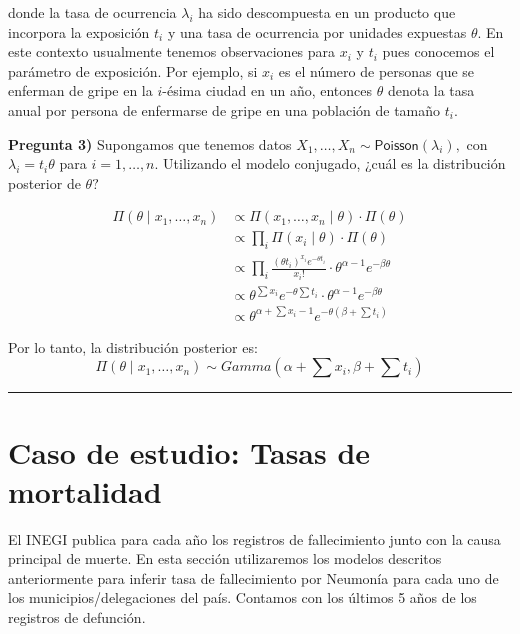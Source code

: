\documentclass[
]{article}
\begin{document}
donde la tasa de ocurrencia \(\lambda_i\) ha sido descompuesta en un
producto que incorpora la exposición \(t_i\) y una tasa de ocurrencia
por unidades expuestas \(\theta.\) En este contexto usualmente tenemos
observaciones para \(x_i\) y \(t_i\) pues conocemos el parámetro de
exposición. Por ejemplo, si \(x_i\) es el número de personas que se
enferman de gripe en la \(i\)-ésima ciudad en un año, entonces
\(\theta\) denota la tasa anual por persona de enfermarse de gripe en
una población de tamaño \(t_i\).

\textbf{Pregunta 3)} Supongamos que tenemos datos
\(X_1, \ldots, X_n \sim \textsf{Poisson}(\lambda_i),\) con
\(\lambda_i = t_i \theta\) para \(i = 1, \ldots, n.\) Utilizando el
modelo conjugado, ¿cuál es la distribución posterior de \(\theta?\)

\[
\begin{align}
\Pi (\theta \mid x_1 , \dots, x_n) 
&\propto \Pi (x_1, \dots, x_n \mid \theta) \cdot \Pi (\theta) \\
&\propto \prod_i{\Pi(x_i \mid \theta)} \cdot \Pi(\theta) \\
&\propto \prod_i{\frac{(\theta t_i)^{x_i} e^{-\theta t_i}}{x_i!}} \cdot \theta^{\alpha-1}e^{-\beta \theta} \\
&\propto \theta^{\sum{x_i}}e^{-\theta\sum t_i} \cdot \theta^{\alpha-1}e^{-\beta \theta} \\
&\propto \theta^{\alpha + \sum{x_i} - 1}e^{-\theta(\beta + \sum t_i)}
\end{align}
\]

Por lo tanto, la distribución posterior es: \[
\Pi (\theta\mid x_1 ,\dots,x_n)\sim Gamma(\alpha + \sum{x_i}, \beta + \sum t_i)
\]

\begin{center}\rule{0.5\linewidth}{0.5pt}\end{center}

\hypertarget{caso-de-estudio-tasas-de-mortalidad}{%
\section{Caso de estudio: Tasas de
mortalidad}\label{caso-de-estudio-tasas-de-mortalidad}}

El INEGI publica para cada año los registros de fallecimiento junto con
la causa principal de muerte. En esta sección utilizaremos los modelos
descritos anteriormente para inferir tasa de fallecimiento por Neumonía
para cada uno de los municipios/delegaciones del país. Contamos con los
últimos 5 años de los registros de defunción.
\end{document}
